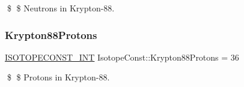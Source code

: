 \$ \$ Neutrons in Krypton-\/88. \mbox{\label{group___isotope_const-_krypton-_kr88_ga5f0c909a7998509cae0dba65222a801e}} 
\subsubsection{\texorpdfstring{Krypton88\+Protons}{Krypton88Protons}}
{\footnotesize\ttfamily \mbox{\hyperlink{group___isotope_const-_macros_ga5f18360b3e99483a35c32d789e62621c}{I\+S\+O\+T\+O\+P\+E\+C\+O\+N\+S\+T\+\_\+\+I\+NT}} Isotope\+Const\+::\+Krypton88\+Protons = 36}

\$ \$ Protons in Krypton-\/88. 